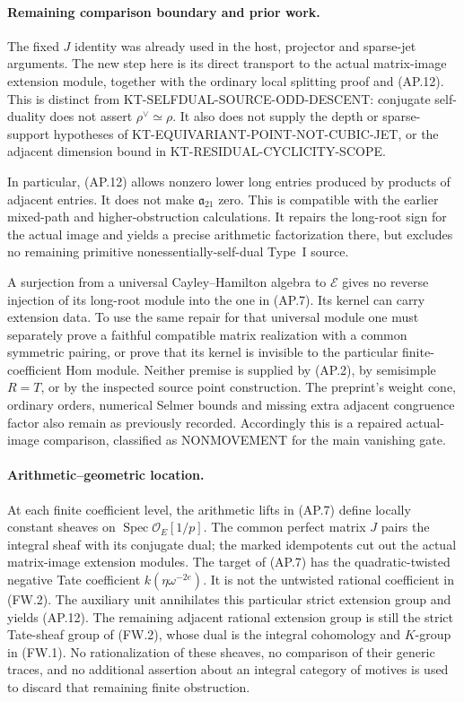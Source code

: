 \paragraph{Remaining comparison boundary and prior work.}
The fixed $J$ identity was already used in the host, projector
and sparse-jet arguments.  The new step here is its direct
transport to the actual matrix-image extension module,
together with the ordinary local splitting proof and (AP.12).
This is distinct from KT-SELFDUAL-SOURCE-ODD-DESCENT:
conjugate self-duality does not assert $\rho^\vee\simeq\rho$.
It also does not supply the depth or sparse-support hypotheses
of KT-EQUIVARIANT-POINT-NOT-CUBIC-JET, or the adjacent
dimension bound in KT-RESIDUAL-CYCLICITY-SCOPE.

In particular, (AP.12) allows nonzero lower long entries
produced by products of adjacent entries.  It does not make
$\mathfrak a_{21}$ zero.  This is compatible with the earlier
mixed-path and higher-obstruction calculations.  It repairs
the long-root sign for the actual image and yields a precise
arithmetic factorization there, but excludes no remaining
primitive nonessentially-self-dual Type~I source.

A surjection from a universal Cayley--Hamilton algebra to
$\mathcal E$ gives no reverse injection of its long-root
module into the one in (AP.7).  Its kernel can carry
extension data.  To use the same repair for that universal
module one must separately prove a faithful compatible
matrix realization with a common symmetric pairing, or
prove that its kernel is invisible to the particular
finite-coefficient Hom module.  Neither premise is supplied
by (AP.2), by semisimple $R=T$, or by the inspected source
point construction.  The preprint's weight cone, ordinary
orders, numerical Selmer bounds and missing extra adjacent
congruence factor also remain as previously recorded.
Accordingly this is a repaired actual-image comparison,
classified as NONMOVEMENT for the main vanishing gate.

\paragraph{Arithmetic--geometric location.}
At each finite coefficient level, the arithmetic lifts in (AP.7)
define locally constant sheaves on
$\operatorname{Spec}\mathcal O_E[1/p]$.
The common perfect matrix $J$ pairs the integral sheaf with
its conjugate dual; the marked idempotents cut out the actual
matrix-image extension modules.  The target of (AP.7) has the
quadratic-twisted negative Tate coefficient
$k(\eta\omega^{-2e})$.  It is not the untwisted rational
coefficient in (FW.2).  The auxiliary unit annihilates this
particular strict extension group and yields (AP.12).
The remaining adjacent rational extension group is still the
strict Tate-sheaf group of (FW.2), whose dual is the integral
cohomology and $K$-group in (FW.1).  No rationalization of
these sheaves, no comparison of their generic traces, and
no additional assertion about an integral category of motives
is used to discard that remaining finite obstruction.

